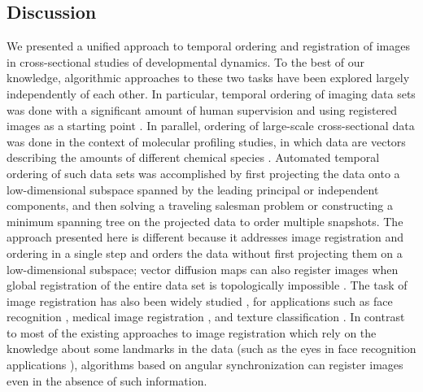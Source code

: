 \documentclass{pnastwo}
\begin{document}
\begin{article}
\section{Discussion}

We presented a unified approach to temporal ordering and registration of images in cross-sectional studies of developmental dynamics. 
%
To the best of our knowledge, algorithmic approaches to these two tasks have been explored largely independently of each other. 
%
In particular, temporal ordering of imaging data sets was done with a significant amount of human supervision and using registered images as a starting point \cite{yuan2014automated, surkova2008characterization}.  
%
In parallel, ordering of large-scale cross-sectional data was done in the context of molecular profiling studies, in which data are vectors describing the amounts of different chemical species \cite{anavy2014blind, trapnell2014dynamics, gupta2008extracting}. 
%
Automated temporal ordering of such data sets was accomplished by first projecting the data onto a low-dimensional subspace spanned by the leading principal or independent components, and then solving a traveling salesman problem or constructing a minimum spanning tree on the projected data to order multiple snapshots. 
%
The approach presented here is different because it addresses image registration and ordering in a single step and orders the data without first projecting them on a low-dimensional subspace; vector diffusion maps can also register images when global registration of the entire data set is topologically impossible \cite{zhao2014rotationally}.
%
The task of image registration has also been widely studied \cite{zitova2003image}, for applications such as face recognition \cite{rowley1998rotation}, medical image registration \cite{hajnal2010medical}, and texture classification \cite{greenspan1994rotation}.
%
In contrast to most of the existing approaches to image registration which rely on the knowledge about some landmarks in the data \cite{ian1998statistical} (such as the eyes in face recognition applications \cite{zhao2003face}), algorithms based on angular synchronization can register images even in the absence of such information. 


\end{article}
\end{document}
